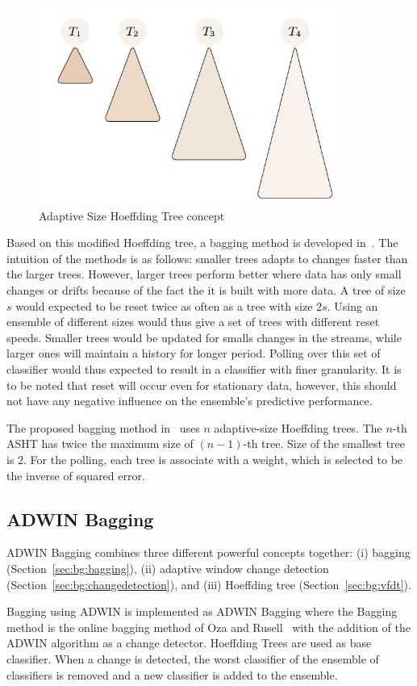 \documentclass[a4paper, 11pt, oneside]{book}
\begin{document}
\begin{figure}[htbp]
    \begin{center}
        \includegraphics[width=10.0cm]{figs/asht.jpg}
        \caption{Adaptive Size Hoeffding Tree concept}
        \label{fig:bg:asht}
    \end{center}
\end{figure}

Based on this modified Hoeffding tree, a bagging method is developed in~\cite{bifet09:asht}. The intuition of the methods is as follows: smaller trees adapts to changes faster than the larger trees. However, larger trees perform better where data has only small changes or drifts because of the fact the it is built with more data. A tree of size $s$ would expected to be reset twice as often as a tree with size $2s$. Using an ensemble of different sizes would thus give a set of trees with different reset speeds. Smaller trees would be updated for smalls changes in the streams, while larger ones will maintain a history for longer period. Polling over this set of classifier would thus expected to result in a classifier with finer granularity. It is to be noted that reset will occur even for stationary data, however, this should not have any negative influence on the ensemble's predictive performance.

The proposed bagging method in~\cite{bifet09:asht} uses $n$ adaptive-size Hoeffding trees. The $n$-th ASHT has twice the maximum size of $(n-1)$-th tree. Size of the smallest tree is 2. For the polling, each tree is associate with a weight, which is selected to be the inverse of squared error.

\subsection{ADWIN Bagging}
ADWIN Bagging combines three different powerful concepts together: (i) bagging (Section~\ref{sec:bg:bagging}), (ii) adaptive window change detection (Section~\ref{sec:bg:changedetection}), and (iii) Hoeffding tree (Section~\ref{sec:bg:vfdt}).

Bagging using ADWIN is implemented as ADWIN Bagging where the Bagging method is the online bagging method of Oza and Rusell~\cite{oza01:obagboost} with the addition of the ADWIN algorithm as a change detector. Hoeffding Trees are used as base classifier. When a change is detected, the worst classifier of the ensemble of classifiers is removed and a new classifier is added to the ensemble. 



\end{document}
